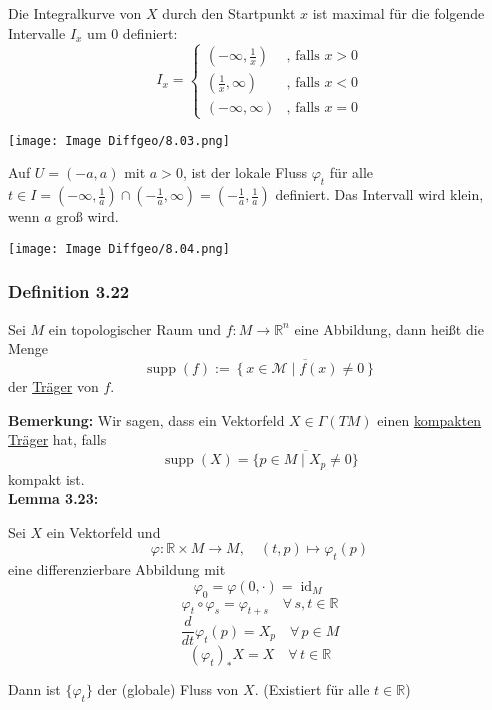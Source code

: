 \documentclass[fleqn, 12pt, letterpaper]{article}
\begin{document}
Die Integralkurve von $X$ durch den Startpunkt $x$ ist maximal für die folgende Intervalle $I_x$ um 0 definiert:
\[
I_x = 
\begin{cases} 
(-\infty, \frac{1}{x}) & \text{, falls } x > 0 \\ 
(\frac{1}{x}, \infty) & \text{, falls } x < 0 \\ 
(-\infty, \infty) & \text{, falls } x = 0 
\end{cases}
\]

\texttt{[image: Image Diffgeo/8.03.png]}

Auf $U = (-a, a)$ mit $a > 0$, ist der lokale Fluss $\varphi_t$ für alle $t \in I= \left(-\infty, \frac{1}{a}\right) \cap \left(-\frac{1}{a}, \infty \right) = \left(-\frac{1}{a}, \frac{1}{a}\right)$ definiert. Das Intervall wird klein, wenn $a$ groß wird.

\texttt{[image: Image Diffgeo/8.04.png]}
\subsubsection*{Definition 3.22}

Sei $M$ ein topologischer Raum und $f: M \rightarrow \mathbb{R}^n$ eine Abbildung, dann heißt die Menge
\[
\operatorname{supp}(f) := \overline{\left\{ x \in \mathcal{M} \mid f(x) \neq 0 \right\}}
\]
der \underline{Träger} von $f$.

\vspace{1em}

\textbf{Bemerkung:} Wir sagen, dass ein Vektorfeld $X \in \Gamma(TM)$ einen \underline{kompakten Träger} hat, falls
\[
\operatorname{supp}(X) =\overline{ \{ p \in M \mid X_p \neq 0 \}}
\]
kompakt ist.\\

\textbf{Lemma 3.23:}

Sei $X$ ein Vektorfeld und 
\[
\varphi : \mathbb{R} \times M \longrightarrow M, \quad (t, p) \longmapsto \varphi_t(p)
\]
eine differenzierbare Abbildung mit
\[
\varphi_0 = \varphi(0, \cdot) = \operatorname{id}_M
\]
\[
\varphi_t \circ \varphi_s =\varphi_{t+s} \quad \forall \, s, t \in \mathbb{R}
\]
\[
\frac{d}{dt} \varphi_t(p) = X_p \quad \forall \, p \in M
\]
\[
(\varphi_t)_\ast X = X \quad \forall \, t \in \mathbb{R}
\]

Dann ist $\{\varphi_t\}$ der (globale) Fluss von $X$. (Existiert für alle $t \in \mathbb{R}$)
\end{document}
